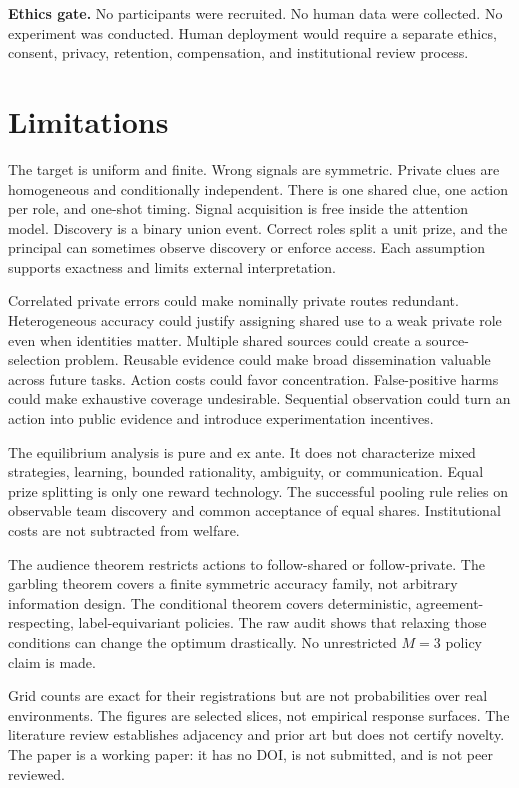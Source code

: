 \documentclass[11pt]{article}
\begin{document}


\noindent\textbf{Ethics gate.} No participants were recruited. No human data
were collected. No experiment was conducted. Human deployment would require a
separate ethics, consent, privacy, retention, compensation, and institutional
review process.

\section{Limitations}

The target is uniform and finite. Wrong signals are symmetric. Private clues are
homogeneous and conditionally independent. There is one shared clue, one action
per role, and one-shot timing. Signal acquisition is free inside the attention
model. Discovery is a binary union event. Correct roles split a unit prize, and
the principal can sometimes observe discovery or enforce access. Each
assumption supports exactness and limits external interpretation.

Correlated private errors could make nominally private routes redundant.
Heterogeneous accuracy could justify assigning shared use to a weak private
role even when identities matter. Multiple shared sources could create a source-
selection problem. Reusable evidence could make broad dissemination valuable
across future tasks. Action costs could favor concentration. False-positive
harms could make exhaustive coverage undesirable. Sequential observation could
turn an action into public evidence and introduce experimentation incentives.

The equilibrium analysis is pure and ex ante. It does not characterize mixed
strategies, learning, bounded rationality, ambiguity, or communication. Equal
prize splitting is only one reward technology. The successful pooling rule
relies on observable team discovery and common acceptance of equal shares.
Institutional costs are not subtracted from welfare.

The audience theorem restricts actions to follow-shared or follow-private. The
garbling theorem covers a finite symmetric accuracy family, not arbitrary
information design. The conditional theorem covers deterministic, agreement-
respecting, label-equivariant policies. The raw audit shows that relaxing those
conditions can change the optimum drastically. No unrestricted $M=3$ policy
claim is made.

Grid counts are exact for their registrations but are not probabilities over
real environments. The figures are selected slices, not empirical response
surfaces. The literature review establishes adjacency and prior art but does
not certify novelty. The paper is a working paper: it has no DOI, is not
submitted, and is not peer reviewed.
\end{document}
